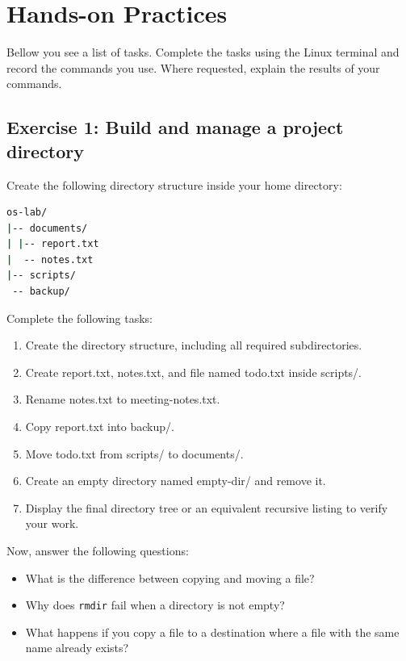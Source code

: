 \section{Hands-on Practices}
Bellow you see a list of tasks. Complete the tasks using the Linux terminal and record the commands you use. Where requested, explain the results of your commands.

\subsection{Exercise 1: Build and manage a project directory}
Create the following directory structure inside your home directory:

\begin{lstlisting}[language=bash]
os-lab/
|-- documents/
| |-- report.txt
|  -- notes.txt
|-- scripts/
 -- backup/
\end{lstlisting}

Complete the following tasks:
\begin{enumerate}
	\item Create the directory structure, including all required subdirectories.
	\item Create report.txt, notes.txt, and file named todo.txt inside scripts/.
	\item Rename notes.txt to meeting-notes.txt.
	\item Copy report.txt into backup/.
	\item Move todo.txt from scripts/ to documents/.
	\item Create an empty directory named empty-dir/ and remove it.
	\item Display the final directory tree or an equivalent recursive listing to verify your work.
\end{enumerate}

Now, answer the following questions:
\begin{itemize}
	\item What is the difference between copying and moving a file? \item Why does \texttt{rmdir} fail when a directory is not empty? \item What happens if you copy a file to a destination where a file with the same name already exists?
\end{itemize}

